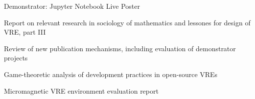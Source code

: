 \begin{workpackage}[id=social-aspects,wphases=0-48,
  title=Social Aspects,
  lead=UO,
  UORM=23,USHRM=18,USORM=6]
\begin{wpdelivs}
 \begin{wpdeliv}[due=36,id=social-poster,dissem=PU,nature=DEM,lead=USH]
   {Demonstrator: Jupyter Notebook Live Poster} 
\end{wpdeliv}

\begin{wpdeliv}[due=42,id=social-report-three,dissem=PU,nature=R,lead=UO]
 {Report on relevant research in sociology of mathematics and lessones
   for design of \TheProject VRE, part III}
\end{wpdeliv}
\begin{wpdeliv}[due=42,id=social-publishing-report,dissem=PU,nature=R,lead=USH]
{Review of new publication mechanisms, including evaluation of
  demonstrator projects}
\end{wpdeliv}

\begin{wpdeliv}[due=42,id=social-gametheoretic,dissem=PU,nature=R,lead=UO]
{Game-theoretic analysis of development practices in open-source VREs}
\end{wpdeliv}

 \begin{wpdeliv}[due=48,id=oommf-nb-evaluation,dissem=PU,nature=R,lead=USO]
      {Micromagnetic VRE environment evaluation report}
\end{wpdeliv}
\end{wpdelivs}
\end{workpackage}

